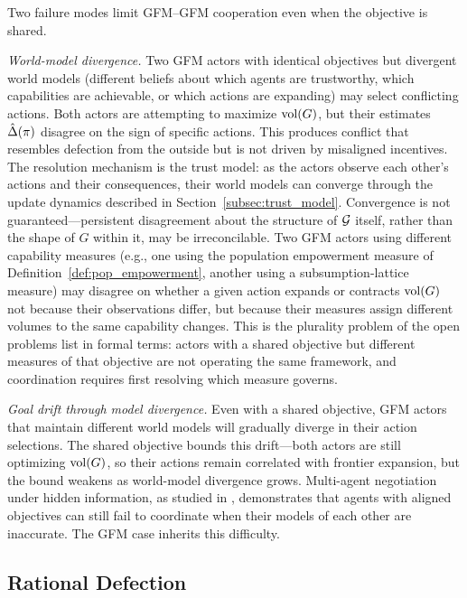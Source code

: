 Two failure modes limit GFM--GFM cooperation even when the objective is shared.

\emph{World-model divergence.} Two GFM actors with identical objectives but
divergent world models (different beliefs about which agents are trustworthy,
which capabilities are achievable, or which actions are expanding) may select
conflicting actions. Both actors are attempting to maximize $\operatorname{vol}(G)$, but
their estimates $\hat{\Delta}(\pi)$ disagree on the sign of specific actions. This
produces conflict that resembles defection from the outside but is not driven
by misaligned incentives. The resolution mechanism is the trust model: as the
actors observe each other's actions and their consequences, their world models
can converge through the update dynamics described in
Section~\ref{subsec:trust_model}. Convergence is not guaranteed---persistent
disagreement about the structure of $\mathcal{G}$ itself, rather than the shape of $G$
within it, may be irreconcilable. Two GFM actors using different capability
measures (e.g., one using the population empowerment measure of
Definition~\ref{def:pop_empowerment}, another using a subsumption-lattice
measure) may disagree on whether a given action expands or contracts $\operatorname{vol}(G)$
not because their observations differ, but because their measures assign
different volumes to the same capability changes. This is the plurality problem
of the open problems list in formal terms: actors with a shared objective but
different measures of that objective are not operating the same framework, and
coordination requires first resolving which measure governs.

\emph{Goal drift through model divergence.} Even with a shared objective, GFM
actors that maintain different world models will gradually diverge in their
action selections. The shared objective bounds this drift---both actors are
still optimizing $\operatorname{vol}(G)$, so their actions remain correlated with frontier
expansion, but the bound weakens as world-model divergence grows. Multi-agent
negotiation under hidden information, as studied in
\citet{kramar2022negotiation}, demonstrates that agents with aligned objectives
can still fail to coordinate when their models of each other are inaccurate.
The GFM case inherits this difficulty.

\subsection{Rational Defection}
\label{subsec:rational_defection}

